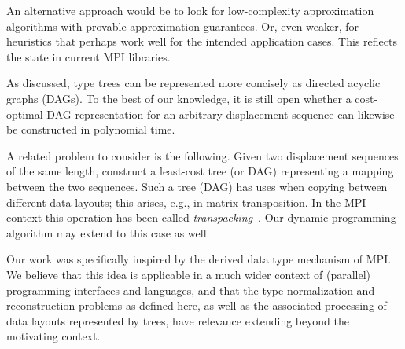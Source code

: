 \documentclass[a4paper,11pt]{article}
\begin{document}
An alternative approach would be to look for low-complexity
approximation algorithms with provable approximation guarantees. Or,
even weaker, for heuristics that perhaps work well for the intended
application cases. This reflects the state in current MPI libraries.

As discussed, type trees can be represented more concisely as directed
acyclic graphs (DAGs). To the best of our knowledge, it is still open
whether a cost-optimal DAG representation for an arbitrary
displacement sequence can likewise be constructed in polynomial time.

A related problem to consider is the following. Given two displacement
sequences of the same length, construct a least-cost tree (or DAG)
representing a mapping between the two sequences. Such a tree (DAG)
has uses when copying between different data layouts; this arises,
e.g., in matrix transposition. In the MPI context this operation has
been called
\emph{transpacking}~\cite{Traff08:iotypes,RossLathamGroppLuskThakur09}. Our
dynamic programming algorithm may extend to this case as well.

Our work was specifically inspired by the derived data type mechanism
of MPI. We believe that this idea is applicable in a much wider
context of (parallel) programming interfaces and languages, and that
the type normalization and reconstruction problems as defined here, as
well as the associated processing of data layouts represented by
trees, have relevance extending beyond the motivating context.



\end{document}
